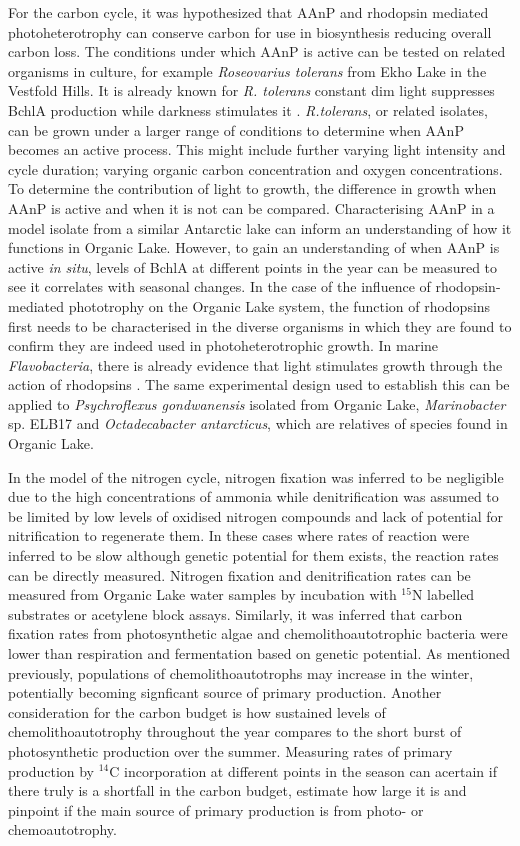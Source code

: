 For the carbon cycle, it was hypothesized that \ac{AAnP} and rhodopsin mediated photoheterotrophy can conserve carbon for use in biosynthesis  reducing overall carbon loss.
The conditions under which \ac{AAnP} is active can be tested on related organisms in culture, for example \emph{Roseovarius tolerans} from Ekho Lake in the Vestfold Hills. 
It is already known for \emph{R. tolerans} constant dim light suppresses \ac{BchlA} production while darkness stimulates it \cite{Labrenz1999}.
\emph{R.tolerans}, or related isolates, can be grown under a larger range of conditions to determine when \ac{AAnP} becomes an active process.
This might include further varying light intensity and cycle duration; varying organic carbon concentration and oxygen concentrations.
To determine the contribution of light to growth, the difference in growth when \ac{AAnP} is active and when it is not can be compared.
Characterising \ac{AAnP} in a model isolate from a similar Antarctic lake can inform an understanding of how it functions in Organic Lake.
However, to gain an understanding of when \ac{AAnP} is active \emph{in situ}, levels of \ac{BchlA} at different points in the year can be measured to see it correlates with seasonal changes.
In the case of the influence of rhodopsin-mediated phototrophy on the Organic Lake system, the function of rhodopsins first needs to be characterised in the diverse organisms in which they are found to confirm they are indeed used in photoheterotrophic growth.
In marine \emph{Flavobacteria}, there is already evidence that light stimulates growth through the action of rhodopsins \cite{Gomez-Consarnau2007}.
The same experimental design used to establish this can be applied to \emph{Psychroflexus gondwanensis} isolated from Organic Lake, \emph{Marinobacter} sp. ELB17 and \emph{Octadecabacter antarcticus}, which are relatives of species found in Organic Lake.

In the model of the nitrogen cycle, nitrogen fixation was inferred to be negligible due to the high concentrations of ammonia while denitrification was assumed to be limited by low levels of oxidised nitrogen compounds and lack of potential for nitrification to regenerate them.
In these cases where rates of reaction were inferred to be slow although genetic potential for them exists, the reaction rates can be directly measured.
Nitrogen fixation and denitrification rates can be measured from Organic Lake water samples by incubation with $^{15}$N labelled substrates or acetylene block assays.
Similarly, it was inferred that carbon fixation rates from photosynthetic algae and chemolithoautotrophic bacteria were lower than respiration and fermentation based on genetic potential.
As mentioned previously, populations of chemolithoautotrophs may increase in the winter, potentially becoming signficant source of primary production.
Another consideration for the carbon budget is how sustained levels of chemolithoautotrophy throughout the year compares to the short burst of photosynthetic production over the summer.
Measuring rates of primary production by $^{14}$C incorporation at different points in the season can acertain if there truly is a shortfall in the carbon budget, estimate how large it is and pinpoint if the main source of primary production is from photo- or chemoautotrophy.

